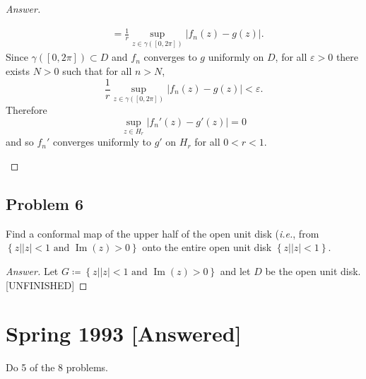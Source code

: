 \documentclass[12pt]{article}
\newcommand{\ita}[1]{\textit{#1}}
\newcommand\paren[1]{\left( #1 \right)}
\newcommand\setb[1]{\left \{ #1 \right \}}
\newcommand{\abs}[1]{\left| #1 \right|}
\newcommand{\eps}{\varepsilon}
\theoremstyle{definition}
\DeclareMathOperator\im{Im}
\begin{document}
\begin{proof}[Answer]
\begin{enumerate}[a.]
\begin{align*}
            & = \frac{1}{r} \sup\limits_{z \in \gamma \paren{ [0,2\pi] } } \abs{ f_n(z) - g(z) }.
        \end{align*}
        Since $\gamma \paren{ [0,2\pi] } \subset D$ and $f_n$ converges to $g$ uniformly on $D$, for all $\eps > 0$ there exists $N > 0$ such that for all $n > N$,
        \[
            \frac{1}{r} \sup\limits_{z \in \gamma \paren{ [0,2\pi] } } \abs{ f_n(z) - g(z) } < \eps.
        \]
        Therefore 
        \[
            \sup\limits_{z \in H_r} \abs{ f_n'(z) - g'(z) } = 0
        \]
        and so $f_n'$ converges uniformly to $g'$ on $H_r$ for all $0 < r < 1$.
    \end{enumerate}
\end{proof}
\subsection{Problem 6}
Find a conformal map of the upper half of the open unit disk (\ita{i.e.}, from $\setb{ z | |z| < 1 \text{ and } \im(z) > 0}$ onto the entire open unit disk $\setb{ z | |z| < 1}$.
\begin{proof}[Answer]
    Let $G \coloneqq \setb{ z | |z| < 1 \text{ and } \im(z) > 0}$ and let $D$ be the open unit disk. [UNFINISHED]
\end{proof}
\newpage
\section{Spring 1993 [Answered]}
Do 5 of the 8 problems.
\end{document}
